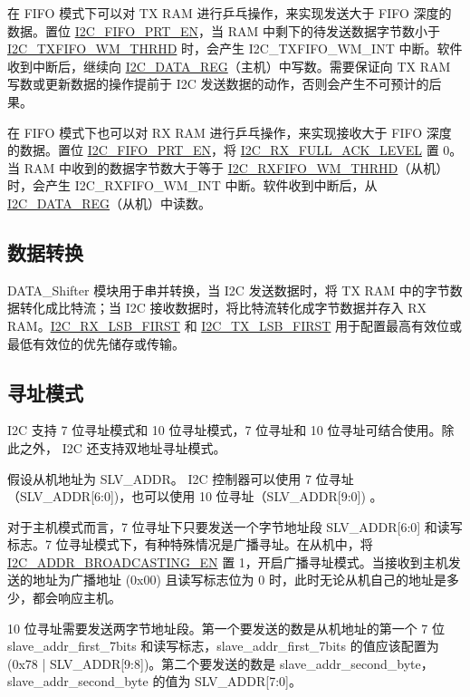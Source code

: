 \documentclass[main\_\_CN.tex]{subfiles}
\begin{document}
在 FIFO 模式下可以对 TX RAM 进行乒乓操作，来实现发送大于 FIFO 深度的数据。置位 \hyperref[fielddesc:I2CFIFOPRTEN]{I2C\_FIFO\_PRT\_EN}，当 RAM 中剩下的待发送数据字节数小于 \hyperref[fielddesc:I2CTXFIFOWMTHRHD]{I2C\_TXFIFO\_WM\_THRHD} 时，会产生 I2C\_TXFIFO\_WM\_INT 中断。软件收到中断后，继续向 \hyperref[regdesc:I2CDATAREG]{I2C\_DATA\_REG}（主机）中写数。需要保证向 TX RAM 写数或更新数据的操作提前于 I2C 发送数据的动作，否则会产生不可预计的后果。

在 FIFO 模式下也可以对 RX RAM 进行乒乓操作，来实现接收大于 FIFO 深度的数据。置位 \hyperref[fielddesc:I2CFIFOPRTEN]{I2C\_FIFO\_PRT\_EN}，将 \hyperref[fielddesc:I2CRXFULLACKLEVEL]{I2C\_RX\_FULL\_ACK\_LEVEL} 置 0。当 RAM 中收到的数据字节数大于等于 \hyperref[fielddesc:I2CRXFIFOWMTHRHD]{I2C\_RXFIFO\_WM\_THRHD}（从机）时，会产生 I2C\_RXFIFO\_WM\_INT 中断。软件收到中断后，从 \hyperref[regdesc:I2CDATAREG]{I2C\_DATA\_REG}（从机）中读数。

\subsection{数据转换}

DATA\_Shifter 模块用于串并转换，当 I2C 发送数据时，将 TX RAM 中的字节数据转化成比特流；当 I2C 接收数据时，将比特流转化成字节数据并存入 RX RAM。\hyperref[fielddesc:I2CRXLSBFIRST]{I2C\_RX\_LSB\_FIRST} 和 \hyperref[fielddesc:I2CTXLSBFIRST]{I2C\_TX\_LSB\_FIRST} 用于配置最高有效位或最低有效位的优先储存或传输。

\subsection{寻址模式}

\chipname{} I2C 支持 7 位寻址模式和 10 位寻址模式，7 位寻址和 10 位寻址可结合使用。除此之外，\chipname{} I2C 还支持双地址寻址模式。

假设从机地址为 SLV\_ADDR。 \chipname{} I2C 控制器可以使用 7 位寻址（SLV\_ADDR[6:0])，也可以使用 10 位寻址（SLV\_ADDR[9:0]) 。

对于主机模式而言，7 位寻址下只要发送一个字节地址段 SLV\_ADDR[6:0] 和读写标志。7 位寻址模式下，有种特殊情况是广播寻址。在从机中，将 \hyperref[fielddesc:I2CADDRBROADCASTINGEN]{I2C\_ADDR\_BROADCASTING\_EN} 置 1，开启广播寻址模式。当接收到主机发送的地址为广播地址 (0x00) 且读写标志位为 0 时，此时无论从机自己的地址是多少，都会响应主机。

10 位寻址需要发送两字节地址段。第一个要发送的数是从机地址的第一个 7 位 slave\_addr\_first\_7bits 和读写标志，slave\_addr\_first\_7bits 的值应该配置为 (0x78 | SLV\_ADDR[9:8])。第二个要发送的数是 slave\_addr\_second\_byte，slave\_addr\_second\_byte 的值为 SLV\_ADDR[7:0]。
\end{document}
